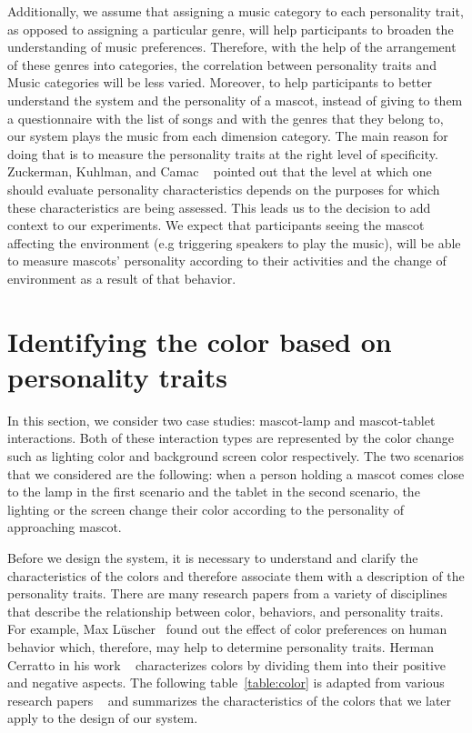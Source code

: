 \par Additionally, we assume that assigning a music category to each personality trait,
as opposed to assigning a particular genre, will help participants to broaden the understanding of music preferences.
Therefore, with the help of the arrangement of these genres into categories,
the correlation between personality traits and Music categories will be less varied.
Moreover, to help participants to better understand the system and the personality of a mascot,
instead of giving to them a questionnaire with the list of songs and with the genres that they
belong to, our system plays the music from each dimension category.
The main reason for doing that is to measure the personality traits at the right level of specificity.
Zuckerman, Kuhlman, and Camac ~\cite{zuckerman1988lies} pointed out that the level at which one
should evaluate personality characteristics depends on the purposes for which these characteristics are being assessed.
This leads us to the decision to add context to our experiments.
We expect that participants seeing the mascot affecting the environment
(e.g triggering speakers to play the music), will be able to measure mascots'
personality according to their activities and the change of environment as a result of that behavior.

\section{Identifying the color based on personality traits}
\label{sec:Identifying the color based on personality traits}

In this section, we consider two case studies: mascot-lamp and mascot-tablet interactions.
Both of these interaction types are represented by the color change such as
lighting color and background screen color respectively.
The two scenarios that we considered are the following: when a person holding a mascot comes close
to the lamp in the first scenario and the tablet in the second scenario, the lighting
or the screen change their color according to the personality of approaching mascot.

Before we design the system, it is necessary to understand and clarify the characteristics
of the colors and therefore associate them with a description of the personality traits.
There are many research papers from a variety of disciplines that describe the
relationship between color, behaviors, and personality traits.
For example, Max Lüscher~\cite{luscher1971luscher} found out the effect of
color preferences on human behavior which, therefore, may help to determine personality traits.
Herman Cerratto in his work ~\cite{cerrato2012meaning} characterizes colors by
dividing them into their positive and negative aspects.
The following table~\ref{table:color} is adapted from various research
papers ~\cite{luscher1971luscher,cerrato2012meaning,schaie1964color} and
summarizes the characteristics of the colors that we later apply to the design of our system.

